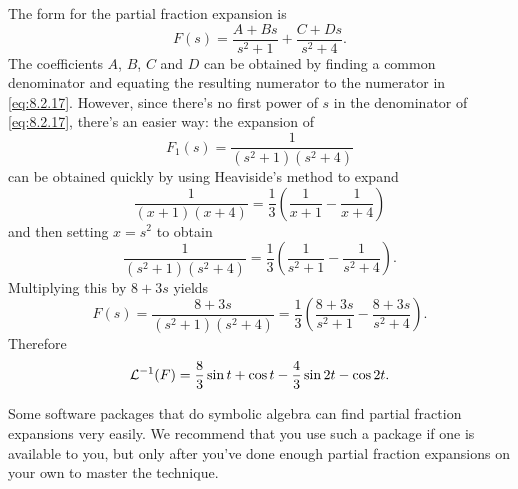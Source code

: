 \begin{examplesolution}
\solution The form for the partial fraction expansion is
\[
  F(s)=\frac{A+Bs}{s^{2}+1}+\frac{C+Ds}{s^{2}+4}.
\]
The coefficients $A$, $B$, $C$ and $D$ can be obtained by finding a common denominator and equating
the resulting numerator to the numerator in \eqref{eq:8.2.17}. However, since there's no first power
of $s$ in the denominator of \eqref{eq:8.2.17}, there's an easier way: the expansion of
\[
  F_{1}(s)=\frac{1}{(s^{2}+1)(s^{2}+4)}
\]
can be obtained quickly by using Heaviside's method to expand
\[
  \frac{1}{(x+1)(x+4)}=\frac{1}{3}\left(\frac{1}{x+1}-\frac{1}{x+4}\right)
\]
and then setting $x=s^{2}$ to obtain
\[
  \frac{1}{(s^{2}+1)(s^{2}+4)}=\frac{1}{3}\left(\frac{1}{s^{2}+1}-\frac{1}{s^{2}+4}\right).
\]
Multiplying this by $8+3s$ yields
\[
  F(s)=\frac{8+3s}{(s^{2}+1)(s^{2}+4)}=\frac{1}{3}\left(\frac{8+3s}{s^{2}+1}-\frac{8+3s}{s^{2}+4}\right).
\]
Therefore
\[
  {\cal L}^{-1}(F)=\frac{8}{3}\sin t+\cos t-\frac{4}{3}\sin2t-\cos2t.
\]
\end{examplesolution}

\technology

\medskip

Some software packages that do symbolic algebra can find partial fraction expansions very easily. We
recommend that you use such a package if one is available to you, but only after you've done enough
partial fraction expansions on your own to master the technique.

\exercises

